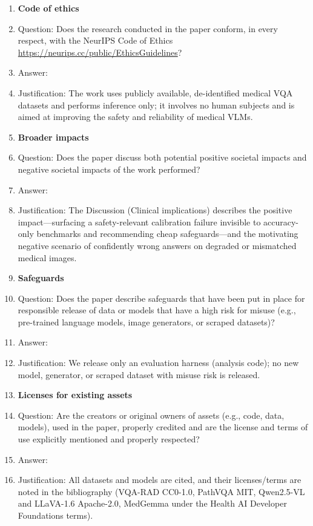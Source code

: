 \begin{enumerate}
\item {\bf Code of ethics}
    \item[] Question: Does the research conducted in the paper conform, in every respect, with the NeurIPS Code of Ethics \url{https://neurips.cc/public/EthicsGuidelines}?
    \item[] Answer: \answerYes{}
    \item[] Justification: The work uses publicly available, de-identified medical VQA datasets and performs inference only; it involves no human subjects and is aimed at improving the safety and reliability of medical VLMs.

\item {\bf Broader impacts}
    \item[] Question: Does the paper discuss both potential positive societal impacts and negative societal impacts of the work performed?
    \item[] Answer: \answerYes{}
    \item[] Justification: The Discussion (Clinical implications) describes the positive impact---surfacing a safety-relevant calibration failure invisible to accuracy-only benchmarks and recommending cheap safeguards---and the motivating negative scenario of confidently wrong answers on degraded or mismatched medical images.

\item {\bf Safeguards}
    \item[] Question: Does the paper describe safeguards that have been put in place for responsible release of data or models that have a high risk for misuse (e.g., pre-trained language models, image generators, or scraped datasets)?
    \item[] Answer: \answerNA{}
    \item[] Justification: We release only an evaluation harness (analysis code); no new model, generator, or scraped dataset with misuse risk is released.

\item {\bf Licenses for existing assets}
    \item[] Question: Are the creators or original owners of assets (e.g., code, data, models), used in the paper, properly credited and are the license and terms of use explicitly mentioned and properly respected?
    \item[] Answer: \answerYes{}
    \item[] Justification: All datasets and models are cited, and their licenses/terms are noted in the bibliography (VQA-RAD CC0-1.0, PathVQA MIT, Qwen2.5-VL and LLaVA-1.6 Apache-2.0, MedGemma under the Health AI Developer Foundations terms).


\end{enumerate}
